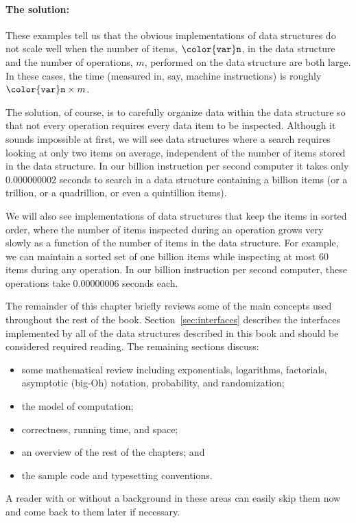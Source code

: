 \documentclass[10pt]{book}
\newcommand{\secref}[1]{Section~\ref{sec:#1}}
\theoremstyle{plain}
\theoremstyle{definition}
\begin{document}
\paragraph{The solution:} 
These examples tell us that the obvious implementations of data structures
do not scale well when the number of items, \ensuremath{\mathtt{{\color{var}n}}}, in the data structure
and the number of operations, $m$, performed on the data structure
are both large.  In these cases, the time (measured in, say, machine
instructions) is roughly $\ensuremath{\mathtt{{\color{var}n}}}\times m$.

The solution, of course, is to carefully organize data within the data
structure so that not every operation requires every data item to be
inspected.  Although it sounds impossible at first, we will see data
structures where a search requires looking at only two items on average,
independent of the number of items stored in the data structure.  In our
billion instruction per second computer it takes only $0.000000002$
seconds to search in a data structure containing a billion items (or a
trillion, or a quadrillion, or even a quintillion items).

We will also see implementations of data structures that keep the
items in sorted order, where the number of items inspected during an
operation grows very slowly as a function of the number of items in
the data structure.  For example, we can maintain a sorted set of one
billion items while inspecting at most 60 items during any operation.
In our billion instruction per second computer, these operations take
$0.00000006$ seconds each.

The remainder of this chapter briefly reviews some of the main concepts
used throughout the rest of the book.   \secref{interfaces} describes
the interfaces implemented by all of the data structures described in
this book and should be considered required reading.  The remaining
sections discuss:
\begin{itemize}
  \item some mathematical review including exponentials, logarithms,
  factorials, asymptotic (big-Oh) notation, probability, and randomization;
  \item the model of computation; 
  \item correctness, running time, and space;
  \item an overview of the rest of the chapters; and
  \item the sample code and typesetting conventions.
\end{itemize}
A reader with or without a background in these areas can easily skip
them now and come back to them later if necessary.
\end{document}
